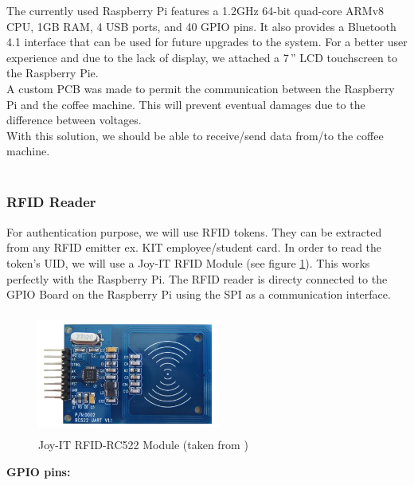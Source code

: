 \documentclass[12pt]{article}
\begin{document}
  The currently used Raspberry Pi features a 1.2GHz 64-bit quad-core ARMv8 CPU, 1GB RAM, 4 USB ports, and 40 GPIO pins.
  It also provides a Bluetooth 4.1 interface that can be used for future upgrades to the system.
  For a better user experience and due to the lack of display, we attached a 7\,'' LCD touchscreen to the Raspberry Pie.\\
  A custom PCB was made to permit the communication between the Raspberry Pi and the coffee machine. 
  This will prevent eventual damages due to the difference between voltages.\\
  With this solution, we should be able to receive/send data from/to the coffee machine.\\~\\
   \subsubsection{RFID Reader}
  For authentication purpose, we will use RFID tokens. They can be extracted from any RFID emitter ex. KIT employee/student card.
  In order to read the token's UID, we will use a Joy-IT RFID Module (see figure \ref{fig:RFID}). This works perfectly with the Raspberry Pi.
  The RFID reader is directy connected to the GPIO Board on the Raspberry Pi using the SPI as a communication interface. 
  
  \begin{figure}[H]
   \centering
   \includegraphics[width=6cm, height=4cm]{./images/rfid}
   \captionsetup{justification=centering}
   \caption{Joy-IT RFID-RC522 Module (taken from \cite{rfidJoy})}
   \label{fig:RFID}
  \end{figure}
  \textbf{GPIO pins:}\\
  
\end{document}

